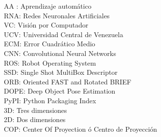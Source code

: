 AA : Aprendizaje automático \\
RNA: Redes Neuronales Artificiales \\
VC: Visión por Computador\\
UCV: Universidad Central de Venezuela\\
ECM: Error Cuadrático Medio \\
CNN: Convolutional Neural Networks\\
ROS: Robot Operating System\\
SSD: Single Shot MultiBox Descriptor\\
ORB: Oriented FAST and Rotated BRIEF\\
DOPE: Deep Object Pose Estimation \\
PyPI: Python Packaging Index \\
3D: Tres dimensiones\\
2D: Dos dimensiones \\
COP: Center Of Proyection ó Centro de Proyección\\